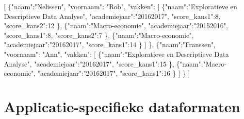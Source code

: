 \documentclass[]{memoir}
\newenvironment{Shaded}{\begin{snugshade}}{\end{snugshade}}
\newcommand{\DataTypeTok}[1]{\textcolor[rgb]{0.13,0.29,0.53}{#1}}
\newcommand{\DecValTok}[1]{\textcolor[rgb]{0.00,0.00,0.81}{#1}}
\newcommand{\FunctionTok}[1]{\textcolor[rgb]{0.00,0.00,0.00}{#1}}
\newcommand{\OtherTok}[1]{\textcolor[rgb]{0.56,0.35,0.01}{#1}}
\newcommand{\StringTok}[1]{\textcolor[rgb]{0.31,0.60,0.02}{#1}}
\begin{document}
\begin{Shaded}
\begin{Highlighting}[]
\OtherTok{[}
  \FunctionTok{\{}\DataTypeTok{"naam"}\FunctionTok{:}\StringTok{"Nelissen"}\FunctionTok{,}
   \DataTypeTok{"voornaam"}\FunctionTok{:} \StringTok{"Rob"}\FunctionTok{,}
   \DataTypeTok{"vakken"}\FunctionTok{:} 
    \OtherTok{[}
      \FunctionTok{\{}\DataTypeTok{"naam"}\FunctionTok{:}\StringTok{"Exploratieve en Descriptieve Data Analyse"}\FunctionTok{,}
       \DataTypeTok{"academiejaar"}\FunctionTok{:}\StringTok{"20162017"}\FunctionTok{,}
       \DataTypeTok{"score_kans1"}\FunctionTok{:}\DecValTok{8}\FunctionTok{,}
       \DataTypeTok{"score_kans2"}\FunctionTok{:}\DecValTok{12}
      \FunctionTok{\}}\OtherTok{,}
      \FunctionTok{\{}\DataTypeTok{"naam"}\FunctionTok{:}\StringTok{"Macro-economie"}\FunctionTok{,}
       \DataTypeTok{"academiejaar"}\FunctionTok{:}\StringTok{"20152016"}\FunctionTok{,}
       \DataTypeTok{"score_kans1"}\FunctionTok{:}\DecValTok{8}\FunctionTok{,}
       \DataTypeTok{"score_kans2"}\FunctionTok{:}\DecValTok{7}
      \FunctionTok{\}}\OtherTok{,}
      \FunctionTok{\{}\DataTypeTok{"naam"}\FunctionTok{:}\StringTok{"Macro-economie"}\FunctionTok{,}
       \DataTypeTok{"academiejaar"}\FunctionTok{:}\StringTok{"20162017"}\FunctionTok{,}
       \DataTypeTok{"score_kans1"}\FunctionTok{:}\DecValTok{14}
      \FunctionTok{\}}
    \OtherTok{]}
  \FunctionTok{\}}\OtherTok{,}
  \FunctionTok{\{}\DataTypeTok{"naam"}\FunctionTok{:}\StringTok{"Franssen"}\FunctionTok{,}
   \DataTypeTok{"voornaam"}\FunctionTok{:} \StringTok{"Ann"}\FunctionTok{,}
   \DataTypeTok{"vakken"}\FunctionTok{:} 
    \OtherTok{[}
      \FunctionTok{\{}\DataTypeTok{"naam"}\FunctionTok{:}\StringTok{"Exploratieve en Descriptieve Data Analyse"}\FunctionTok{,}
       \DataTypeTok{"academiejaar"}\FunctionTok{:}\StringTok{"20162017"}\FunctionTok{,}
       \DataTypeTok{"score_kans1"}\FunctionTok{:}\DecValTok{15}
      \FunctionTok{\}}\OtherTok{,}
      \FunctionTok{\{}\DataTypeTok{"naam"}\FunctionTok{:}\StringTok{"Macro-economie"}\FunctionTok{,}
       \DataTypeTok{"academiejaar"}\FunctionTok{:}\StringTok{"20162017"}\FunctionTok{,}
       \DataTypeTok{"score_kans1"}\FunctionTok{:}\DecValTok{16}
      \FunctionTok{\}}
    \OtherTok{]}
  \FunctionTok{\}}
\OtherTok{]}
\end{Highlighting}
\end{Shaded}

\hypertarget{applicatie-specifieke-dataformaten-1}{%
\section{Applicatie-specifieke dataformaten}\label{applicatie-specifieke-dataformaten-1}}
\end{document}
